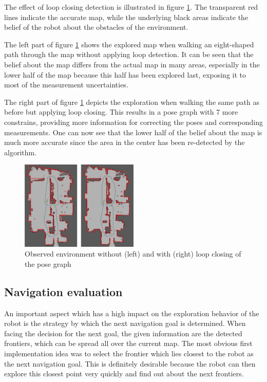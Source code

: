 \documentclass{ba-kecs}
\begin{document}
The effect of loop closing detection is illustrated in figure \ref{fig:loop_closing_comparison}. The transparent red lines indicate the accurate map, while the underlying black areas indicate the belief of the robot about the obstacles of the environment.

The left part of figure \ref{fig:loop_closing_comparison} shows the explored map when walking an eight-shaped path through the map without applying loop detection. It can be seen that the belief about the map differs from the actual map in many areas, especially in the lower half of the map because this half has been explored last, exposing it to most of the measurement uncertainties.

The right part of figure \ref{fig:loop_closing_comparison} depicts the exploration when walking the same path as before but applying loop closing. This results in a pose graph with 7 more constrains, providing more information for correcting the poses and corresponding measurements. One can now see that the lower half of the belief about the map is much more accurate since the area in the center has been re-detected by the algorithm.

\begin{figure}[htbp]
	\centering
		\includegraphics[width=0.50\textwidth]{figures/Loop_closing_compared.jpg}
	\caption{Observed environment without (left) and with (right) loop closing of the pose graph}
	\label{fig:loop_closing_comparison}
\end{figure}

\subsection{Navigation evaluation}
An important aspect which has a high impact on the exploration behavior of the robot is the strategy by which the next navigation goal is determined. When facing the decision for the next goal, the given information are the detected frontiers, which can be spread all over the current map. The most obvious first implementation idea was to select the frontier which lies closest to the robot as the next navigation goal. This is definitely desirable because the robot can then explore this closest point very quickly and find out about the next frontiers.
\end{document}
